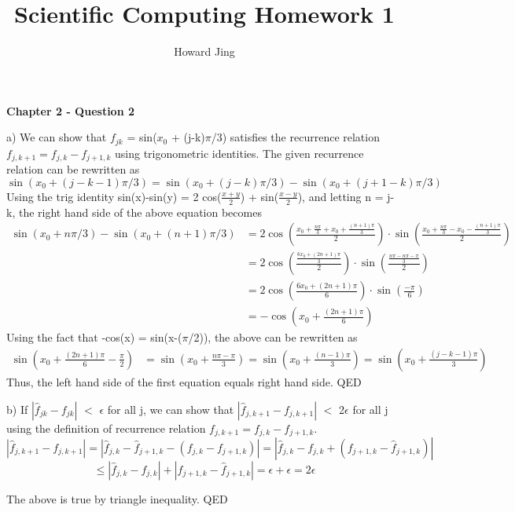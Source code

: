 \documentclass{article}
\title{Scientific Computing Homework 1}
\author{Howard Jing}
\begin{document}
\maketitle
\textbf{Chapter 2 - Question 2}

a) We can show that $f_{jk}$ = sin($x_{0}$ + (j-k)$\pi$/3) satisfies the recurrence relation $ {f}_{j,k+1} = f_{j,k} - f_{j+1,k}  $ using trigonometric identities. The given recurrence relation can be rewritten as 
\[
\sin(x_{0}+(j-k-1)\pi/3) = \sin(x_{0}+(j-k)\pi/3) - \sin(x_{0}+(j+1-k)\pi/3)
\]
Using the trig identity sin(x)-sin(y) = 2 cos($\frac{x+y}{2}$) + sin($\frac{x-y}{2}$), and letting n = j-k, the right hand side of the above equation becomes 
\begin{align*}
\sin(x_{0}+n\pi/3) - \sin(x_{0}+(n+1)\pi/3) &= 2 \cos(\frac{ x_{0}+\frac{n\pi}{3}+x_{0}+\frac{(n+1)\pi}{3}}{2}) \cdot \sin(\frac{ x_{0}+\frac{n\pi}{3}-x_{0}-\frac{(n+1)\pi}{3}}{2})\\
&= 2 \cos(\frac{\frac{6x_{0}+(2n+1)\pi} {3}} {2 }) \cdot \sin(\frac{\frac{n\pi-n\pi-\pi} {3}} {2})\\
&=2\cos(\frac{6x_{0}+(2n+1)\pi}{6}) \cdot \sin(\frac{-\pi}{6})\\
&=-\cos(x_{0}+\frac{(2n+1)\pi}{6})
\end{align*}
Using the fact that -cos(x) = sin(x-($\pi$/2)), the above can be rewritten as 
\begin{align*}
\sin(x_{0}+\frac{(2n+1)\pi}{6}-\frac{\pi}{2}) &= \sin(x_{0}+\frac{n\pi-\pi}{3}) = \sin(x_{0}+\frac{(n-1)\pi}{3}) = \sin(x_{0}+\frac{(j-k-1)\pi}{3})
\end{align*}
Thus, the left hand side of the first equation equals right hand side. QED


b) If $\left |  \hat{f}_{jk}-f_{jk}  \right |$ $<$ $\epsilon$ for all j, we can show that $\left |  \hat{f}_{j,k+1}-f_{j,k+1}  \right |$ $<$ 2$\epsilon$ for all j using the definition of recurrence relation $ {f}_{j,k+1} = f_{j,k} - f_{j+1,k}  $. 
\[
\left |  \hat{f}_{j,k+1}-f_{j,k+1}  \right | = \left |  \hat{f}_{j,k}-\hat{f}_{j+1,k}-(f_{j,k}-f_{j+1,k})  \right | =  \left |  \hat{f}_{j,k}-f_{j,k}+(f_{j+1,k}-\hat{f}_{j+1,k})  \right | 
\]
\[
\le \left |  \hat{f}_{j,k}-f_{j,k} \right |+ \left |f_{j+1,k}-\hat{f}_{j+1,k}  \right | = \epsilon + \epsilon = 2\epsilon
\]

The above is true by triangle inequality. QED
\end{document}
